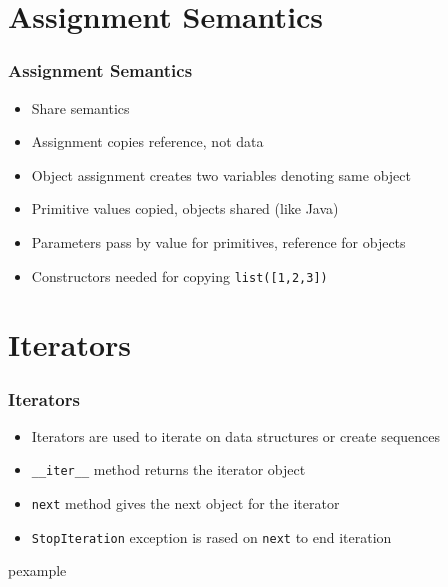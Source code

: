 \documentclass[trans,compress,xcolor=table]{beamer}
\begin{document}
\section{Assignment Semantics}
\begin{frame}
\frametitle{Assignment Semantics}
\begin{itemize}
\item Share semantics
\item Assignment copies reference, not data
\item Object assignment creates two variables denoting
	same object
\item Primitive values copied, objects shared (like Java)
\item Parameters pass by value for primitives, reference for
	objects
\item Constructors needed for copying \lstinline!list([1,2,3])!
\end{itemize}
\end{frame}

\section{Iterators}
\begin{frame}
\frametitle{Iterators}
\begin{itemize}
\item Iterators are used to iterate on data structures or create
	sequences
\item \lstinline!__iter__! method returns the iterator object
\item \lstinline!next! method gives the next object for the iterator
\item \lstinline!StopIteration! exception is rased on \lstinline!next! to
	end iteration
\end{itemize}
\end{frame}

\begin{frame}
\begin{beamercolorbox}{pexample}
\codeiterator
\end{beamercolorbox}
\end{frame}
\end{document}
